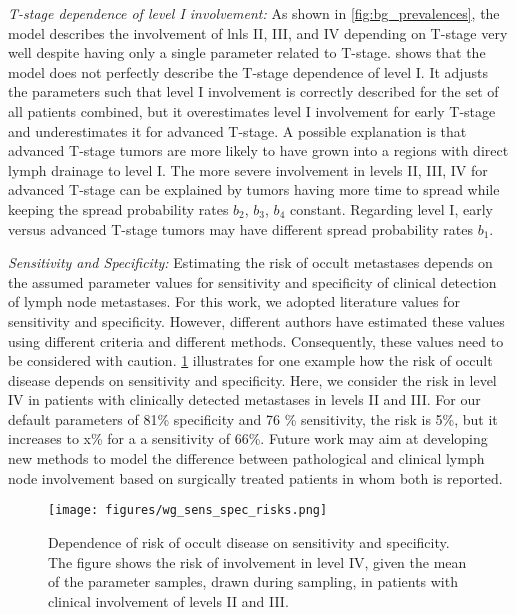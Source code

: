 \documentclass[twocolumn]{aastex631}
\begin{document}
{\it T-stage dependence of level I involvement:} As shown in \cref{fig:bg_prevalences}, the model describes the involvement of \glspl{lnl} II, III, and IV depending on T-stage very well despite having only a single parameter related to T-stage.  shows that the model does not perfectly describe the T-stage dependence of level I. It adjusts the parameters such that level I involvement is correctly described for the set of all patients combined, but it overestimates level I involvement for early T-stage and underestimates it for advanced T-stage. A possible explanation is that advanced T-stage tumors are more likely to have grown into a regions with direct lymph drainage to level I. The more severe involvement in levels II, III, IV for advanced T-stage can be explained by tumors having more time to spread while keeping the spread probability rates $b_2$, $b_3$, $b_4$ constant. Regarding level I, early versus advanced T-stage tumors may have different spread probability rates $b_1$.

{\it Sensitivity and Specificity:} Estimating the risk of occult metastases depends on the assumed parameter values for sensitivity and specificity of clinical detection of lymph node metastases. For this work, we adopted literature values for sensitivity and specificity. However, different authors have estimated these values using different criteria and different methods. Consequently, these values need to be considered with caution. \cref{fig:wg_sens_spec_risks} illustrates for one example how the risk of occult disease depends on sensitivity and specificity. Here, we consider the risk in level IV in patients with clinically detected metastases in levels II and III. For our default parameters of 81\% specificity and 76 \% sensitivity, the risk is 5\%, but it increases to x\% for a a sensitivity of 66\%. Future work may aim at developing new methods to model the difference between pathological and clinical lymph node involvement based on surgically treated patients in whom both is reported.  

\begin{figure}
    \begin{centering}
        \texttt{[image: figures/wg\_sens\_spec\_risks.png]}
        \caption{Dependence of risk of occult disease on sensitivity and specificity. The figure shows the risk of involvement in level IV, given the mean of the parameter samples, drawn during sampling, in patients with clinical involvement of levels II and III.}
        \label{fig:wg_sens_spec_risks}
    \end{centering}
\end{figure}
\end{document}
